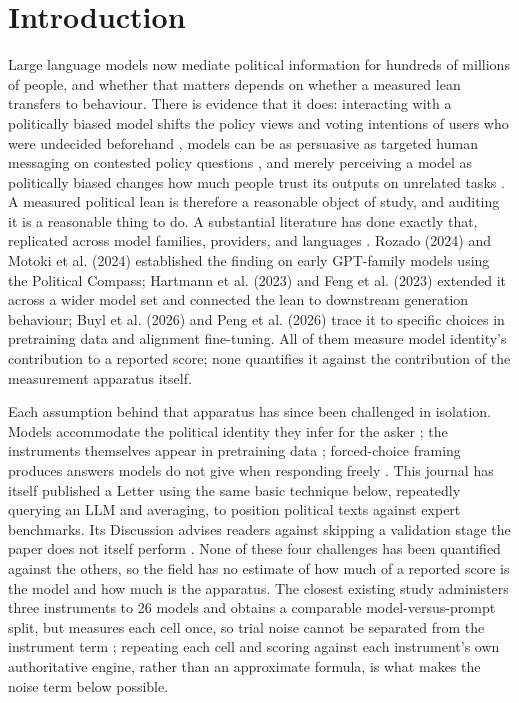 \documentclass[12pt]{article}
\begin{document}
\clearpage

\section{Introduction}

Large language models now mediate political information for hundreds of
millions of people, and whether that matters depends on whether a measured
lean transfers to behaviour. There is evidence that it does: interacting
with a politically biased model shifts the policy views and voting
intentions of users who were undecided beforehand \citep{fisher2026biasedai},
models can be as persuasive as targeted human messaging on contested policy
questions \citep{bai2025persuade, hackenburg2025levers}, and merely
perceiving a model as politically biased changes how much people trust its
outputs on unrelated tasks \citep{digiuseppe2026perceived}. A measured
political lean is therefore a reasonable object of study, and auditing it
is a reasonable thing to do. A substantial literature has done exactly
that, replicated across model families, providers, and languages
\citep{rozado2024, motoki2024, hartmann2023, feng2023, buyl2026,
peng2026beyond, sakhawat2026polalign}. Rozado (2024) and Motoki et al.
(2024) established the finding on early GPT-family models using the
Political Compass; Hartmann et al. (2023) and Feng et al. (2023) extended
it across a wider model set and connected the lean to downstream generation
behaviour; Buyl et al. (2026) and Peng et al. (2026) trace it to specific
choices in pretraining data and alignment fine-tuning. All of them measure
model identity's contribution to a reported score; none quantifies it
against the contribution of the measurement apparatus itself.

Each assumption behind that apparatus has since been challenged in
isolation. Models accommodate the political identity they infer for the
asker \citep{tornberg2026sycophancy}; the instruments themselves appear in
pretraining data \citep{bianchi2026plasticity}; forced-choice framing
produces answers models do not give when responding freely
\citep{rottger2024}. This journal has itself published a Letter using the
same basic technique below, repeatedly querying an LLM and averaging, to
position political texts against expert benchmarks. Its Discussion advises
readers against skipping a validation stage the paper does not itself
perform \citep{lemens2025asking}. None of these four challenges has been
quantified against the others, so the field has no
estimate of how much of a reported score is the model and how much is the
apparatus. The closest existing study administers three instruments to 26
models and obtains a comparable model-versus-prompt split, but measures
each cell once, so trial noise cannot be separated from the instrument term
\citep{sakhawat2026polalign}; repeating each cell and scoring against each
instrument's own authoritative engine, rather than an approximate formula,
is what makes the noise term below possible.
\end{document}
